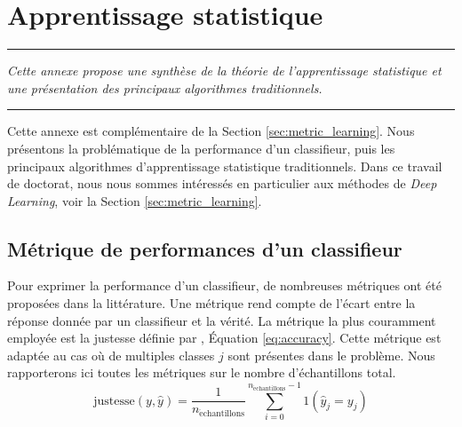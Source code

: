 

\FloatBarrier
\chapter{Apprentissage statistique}
\label{Ann:3}


\begin{center}
	\rule{0.7\linewidth}{.5pt}
	\begin{minipage}{0.7\linewidth}
		\smallskip
		
		\textit{
			Cette annexe propose une synthèse de la théorie de l'apprentissage statistique et une présentation des principaux algorithmes traditionnels.
		}
		
	\end{minipage}
	\smallskip
	\rule{0.7\linewidth}{.5pt}
\end{center}

\bigskip

Cette annexe est complémentaire de la Section \ref{sec:metric_learning}.
Nous présentons la problématique de la performance d'un classifieur, puis les principaux algorithmes d'apprentissage statistique traditionnels.
Dans ce travail de doctorat, nous nous sommes intéressés en particulier aux méthodes de \textit{Deep Learning}, voir la Section \ref{sec:metric_learning}.

\section{Métrique de performances d'un classifieur}
Pour exprimer la performance d'un classifieur, de nombreuses métriques ont été proposées dans la littérature.
Une métrique rend compte de l'écart entre la réponse donnée par un classifieur et la vérité.
La métrique la plus couramment employée est la justesse définie par \citeauthor{metz_basic_1978} \cite{metz_basic_1978}, Équation \ref{eq:accuracy}.
Cette métrique est adaptée au cas où de multiples classes $j$ sont présentes dans le problème.
Nous rapporterons ici toutes les métriques sur le nombre d'échantillons total.
\begin{equation} \label{eq:accuracy}
\text{justesse}(y, \hat{y})=\frac{1}{n_{\mathrm{\acute{e}chantillons}}} \sum_{i=0}^{n_{\mathrm{\acute{e}chantillons}}-1} 1\left(\hat{y}_{j}=y_{j}\right)
\end{equation}


